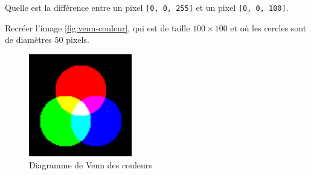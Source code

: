 \ssques Quelle est la différence entre un pixel \texttt{[0, 0, 255]} et un pixel \texttt{[0, 0, 100]}.

\quessques Recréer l'image \autoref{fig:venn-couleur}, qui est de taille $ 100 \times 100 $ et où les cercles sont de diamètres $ 50 $ pixels.

\begin{figure}[h!]
    \begin{center}
        \includegraphics[width=0.4\textwidth]{figures/11/rgb-venn.png}
    \end{center}
    \caption{Diagramme de Venn des couleurs}
    \label{fig:venn-couleur}
\end{figure}

